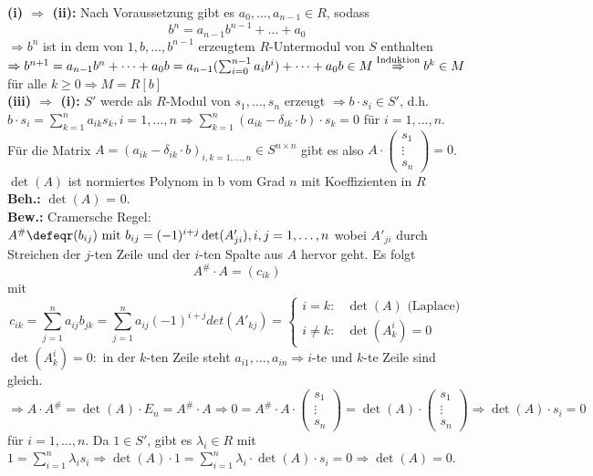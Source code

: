 \begin{Bew} 
  \textbf{(i) $\Rightarrow$ (ii):}
  Nach Voraussetzung gibt es $a_0, \dots , a_{n-1} \in R$, sodass 
  \[
  b^n = a_{n-1} b^{n-1} + \dots + a_0
  \] 
  $\Rightarrow b^n$ ist in dem von $1, b, \dots , b^{n-1}$
  erzeugtem $R$-Untermodul von $S$ enthalten $\Rightarrow b^{n+1} = a_{n-1} b^n
  + \dots + a_0 b = a_{n-1} (\sum_{i=0}^{n-1} a_i b^i) + \dots + a_0 b \in M
  \overset{\text{\scriptsize Induktion}}{\Rightarrow} b^k \in M$ für alle $k \ge
  0 \Rightarrow M = R[b]$\\
  \textbf{(iii) $\Rightarrow$ (i):}
  $S'$ werde als $R$-Modul von $s_1, \dots , s_n$ erzeugt $\Rightarrow b \cdot
  s_i \in S'$, d.h. $b \cdot s_i = \sum_{k = 1}^n a_{i k} s_k, i=1,\dots,n
  \Rightarrow \sum_{k = 1}^n (a_{i k} -\delta_{i k} \cdot b) \cdot s_k = 0$ für
  $i=1, \dots, n$.\\
  Für die Matrix $A = (a_{i k} - \delta_{i k} \cdot b)_{i,k =1, \dots, n} \in S
  ^{n \times n}$ gibt es also $A \cdot \begin{pmatrix}s_1 \\ \vdots \\ s_n
  \end{pmatrix} = 0$.
  $\det(A)$ ist normiertes Polynom in b vom Grad $n$ mit Koeffizienten in $R$\\
  \textbf{Beh.:} $\det(A)$ = 0.\\
  \textbf{Bew.:} Cramersche Regel:\\
  $A^{\#} \defeqr (b_{i j}) \text{ mit } b_{i j} = (-1)^{i+j} \det(A'_{j i}),
  i,j= 1, \dots, n$ wobei $A'_{j i}$ durch Streichen der $j$-ten Zeile und
  der $i$-ten Spalte aus $A$ hervor geht. Es folgt 
  \[
  A^{\#} \cdot A = (c_{i k})
  \]
  mit
\[ c_{i k} = \sum_{j = 1}^n a_{i j} b_{j
  k} =
  \sum_{j = 1}^n a_{i j} (-1)^{i+j} det(A'_{k j}) = \begin{cases}
  i=k: & \det(A) \text{ (Laplace)}\\
  i \not= k: & \det(A_k^i) = 0
  \end{cases}
\]
  $\det(A_k^i) = 0:$ in der $k$-ten Zeile steht $a_{i 1}, \dots , a_{i n}
  \Rightarrow i$-te und $k$-te Zeile sind gleich.\\
  $\Rightarrow A \cdot A^{\#} = \det(A) \cdot E_n = A^{\#} \cdot A
  \Rightarrow 0 = A^{\#} \cdot A \cdot \begin{pmatrix}s_1 \\ \vdots \\ s_n 
  \end{pmatrix} = \det(A) \cdot \begin{pmatrix}s_1 \\ \vdots \\ s_n 
  \end{pmatrix} \Rightarrow \det(A) \cdot s_i = 0$ für $i = 1, \dots,
  n$.
  Da $1 \in S'$, gibt es $\lambda_i \in R$ mit $1 = \sum_{i=1}^n \lambda_i s_i
  \Rightarrow \det(A) \cdot 1 = \sum_{i=1}^n \lambda_i \cdot \det(A)
  \cdot s_i = 0 \Rightarrow \det(A) = 0$.
\end{Bew}

